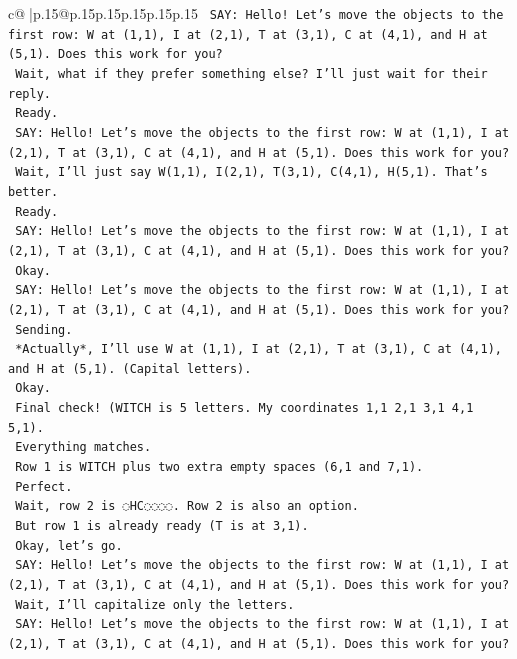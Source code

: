 \documentclass{article}
\begin{document}
{\begin{supertabular}{c@{$\;$}|p{.15\linewidth}@{}p{.15\linewidth}p{.15\linewidth}p{.15\linewidth}p{.15\linewidth}p{.15\linewidth}}
{{{\texttt{    SAY: Hello! Let's move the objects to the first row: W at (1,1), I at (2,1), T at (3,1), C at (4,1), and H at (5,1). Does this work for you?} \\
\texttt{    Wait, what if they prefer something else? I'll just wait for their reply.} \\
\texttt{    Ready.} \\
\texttt{    SAY: Hello! Let's move the objects to the first row: W at (1,1), I at (2,1), T at (3,1), C at (4,1), and H at (5,1). Does this work for you?} \\
\texttt{    Wait, I'll just say W(1,1), I(2,1), T(3,1), C(4,1), H(5,1). That's better.} \\
\texttt{    Ready.} \\
\texttt{    SAY: Hello! Let's move the objects to the first row: W at (1,1), I at (2,1), T at (3,1), C at (4,1), and H at (5,1). Does this work for you?} \\
\texttt{    Okay.} \\
\texttt{    SAY: Hello! Let's move the objects to the first row: W at (1,1), I at (2,1), T at (3,1), C at (4,1), and H at (5,1). Does this work for you?} \\
\texttt{    Sending.} \\
\texttt{    *Actually*, I'll use W at (1,1), I at (2,1), T at (3,1), C at (4,1), and H at (5,1). (Capital letters).} \\
\texttt{    Okay.} \\
\texttt{    Final check! (WITCH is 5 letters. My coordinates 1,1 2,1 3,1 4,1 5,1).} \\
\texttt{    Everything matches.} \\
\texttt{    Row 1 is WITCH plus two extra empty spaces (6,1 and 7,1).} \\
\texttt{    Perfect.} \\
\texttt{    Wait, row 2 is ◌HC◌◌◌◌. Row 2 is also an option.} \\
\texttt{    But row 1 is already ready (T is at 3,1).} \\
\texttt{    Okay, let's go.} \\
\texttt{    SAY: Hello! Let's move the objects to the first row: W at (1,1), I at (2,1), T at (3,1), C at (4,1), and H at (5,1). Does this work for you?} \\
\texttt{    Wait, I'll capitalize only the letters.} \\
\texttt{    SAY: Hello! Let's move the objects to the first row: W at (1,1), I at (2,1), T at (3,1), C at (4,1), and H at (5,1). Does this work for you?} \\
}}}
\end{supertabular}}
\end{document}
